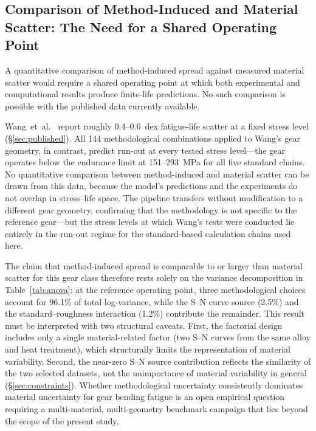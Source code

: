 \documentclass[twocolumn,12pt,a4paper]{article}
\begin{document}
\subsection{Comparison of Method-Induced and Material Scatter: The Need for a Shared Operating Point}
\label{sec:method_dominates}

A quantitative comparison of method-induced spread against measured
material scatter would require a shared operating point at which both
experimental and computational results produce finite-life predictions.
No such comparison is possible with the published data currently
available.

Wang~et~al.~\cite{wang2023} report roughly 0.4--0.6~dex
fatigue-life scatter at a fixed stress level
(\S\ref{sec:published}). All 144 methodological combinations applied
to Wang's gear geometry, in contrast, predict
run-out at every tested stress level---the gear operates below the
endurance limit at 151--293~MPa for all five standard chains. No
quantitative comparison between method-induced and material scatter
can be drawn from this data, because the model's predictions and the
experiments do not overlap in stress--life space. The pipeline
transfers without modification to a different gear geometry, confirming
that the methodology is not specific to the reference gear---but the
stress levels at which Wang's tests were conducted lie entirely in the
run-out regime for the standard-based calculation chains used here.

The claim that method-induced spread is comparable to or larger than
material scatter for this gear class therefore rests solely on the
variance decomposition in Table~\ref{tab:anova}: at the reference
operating point, three methodological choices account for 96.1\% of
total log-variance, while the S--N curve source (2.5\%) and the
standard--roughness interaction (1.2\%) contribute the remainder. This result must be interpreted with two structural
caveats. First, the factorial design includes only a single
material-related factor (two S--N curves from the same alloy and heat
treatment), which structurally limits the representation of material
variability. Second, the near-zero S--N source contribution reflects
the similarity of the two selected datasets, not the unimportance of
material variability in general (\S\ref{sec:constraints}). Whether
methodological uncertainty consistently dominates material uncertainty
for gear bending fatigue is an open empirical question requiring a
multi-material, multi-geometry benchmark campaign that lies beyond the
scope of the present study.
\end{document}
